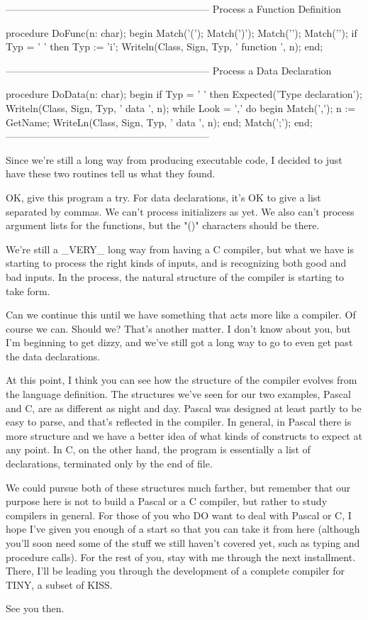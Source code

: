 \documentclass[float=false, crop=false]{standalone}
\begin{document}
\begin{code}
{--------------------------------------------------------------}
{ Process a Function Definition }

procedure DoFunc(n: char);
begin
   Match('(');
   Match(')');
   Match('{');
   Match('}');
   if Typ = ' ' then Typ := 'i';
   Writeln(Class, Sign, Typ, ' function ', n);
end;

{--------------------------------------------------------------}
{ Process a Data Declaration }

procedure DoData(n: char);
begin
   if Typ = ' ' then Expected('Type declaration');
   Writeln(Class, Sign, Typ, ' data ', n);
   while Look = ',' do begin
      Match(',');
      n := GetName;
      WriteLn(Class, Sign, Typ, ' data ', n);
   end;
   Match(';');
end;
{--------------------------------------------------------------}
\end{code}

Since we're still a long way from producing executable code, I decided to just
have these two routines tell us what they found.

OK, give this program a try. For data declarations, it's OK to give a list
separated by commas. We can't process initializers as yet. We also can't process
argument lists for the functions, but the "(){}" characters should be there.

We're still a _VERY_ long way from having a C compiler, but what we have is
starting to process the right kinds of inputs, and is recognizing both good and
bad inputs. In the process, the natural structure of the compiler is starting to
take form.

Can we continue this until we have something that acts more like a compiler. Of
course we can. Should we? That's another matter. I don't know about you, but I'm
beginning to get dizzy, and we've still got a long way to go to even get past
the data declarations.

At this point, I think you can see how the structure of the compiler evolves
from the language definition. The structures we've seen for our two examples,
Pascal and C, are as different as night and day. Pascal was designed at least
partly to be easy to parse, and that's reflected in the compiler. In general, in
Pascal there is more structure and we have a better idea of what kinds of
constructs to expect at any point. In C, on the other hand, the program is
essentially a list of declarations, terminated only by the end of file.

We could pursue both of these structures much farther, but remember that our
purpose here is not to build a Pascal or a C compiler, but rather to study
compilers in general. For those of you who DO want to deal with Pascal or C, I
hope I've given you enough of a start so that you can take it from here
(although you'll soon need some of the stuff we still haven't covered yet, such
as typing and procedure calls). For the rest of you, stay with me through the
next installment. There, I'll be leading you through the development of a
complete compiler for TINY, a subset of KISS.

See you then.
\end{document}
